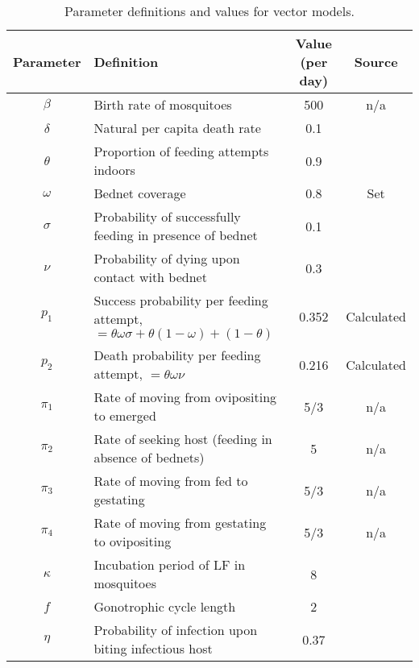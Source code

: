 \documentclass[5p,times]{elsarticle}
\begin{document}
\begin{table*}[t]
\caption{Parameter definitions and values for vector models.}%
\vspace{.1cm}
\centering %
\begin{tabular}{c l c c}%
\hline\hline                        %
Parameter & Definition & Value (per day) & Source \\ [0.5ex]%
\hline                  %
$\beta$ & Birth rate of mosquitoes & 500 & n/a \\%
$\delta$ & Natural per capita death rate & 0.1 & \cite{le2007} \\
$\theta$ & Proportion of feeding attempts indoors & 0.9 & \cite{le2007} \\
$\omega$ & Bednet coverage & 0.8 & Set \\
$\sigma$ & Probability of successfully feeding in presence of bednet & 0.1 & \cite{le2007} \\
$\nu$ & Probability of dying upon contact with bednet & 0.3 & \cite{le2007} \\
$p_1$ & Success probability per feeding attempt, $= \theta\omega\sigma+\theta(1-\omega)+(1-\theta)$ & 0.352 & Calculated \\
$p_2$ & Death probability per feeding attempt, $= \theta\omega\nu$ & 0.216 & Calculated \\
$\pi_1$ & Rate of moving from ovipositing to emerged & 5/3 & n/a  \\
$\pi_2$ & Rate of seeking host (feeding in absence of bednets) & 5 & n/a  \\
$\pi_3$ & Rate of moving from fed to gestating & 5/3 & n/a  \\ 
$\pi_4$ & Rate of moving from gestating to ovipositing & 5/3 & n/a \\
$\kappa$ & Incubation period of LF in mosquitoes & 8 & \cite{le2007,erickson2009}  \\ 
$f$ & Gonotrophic cycle length & 2 & \cite{quinones1997}  \\
$\eta$ & Probability of infection upon biting infectious host & 0.37 & \cite{gambhir2008}  \\[1ex]      %
\hline%
\end{tabular}
\label{table:param}%
\end{table*}
\end{document}
